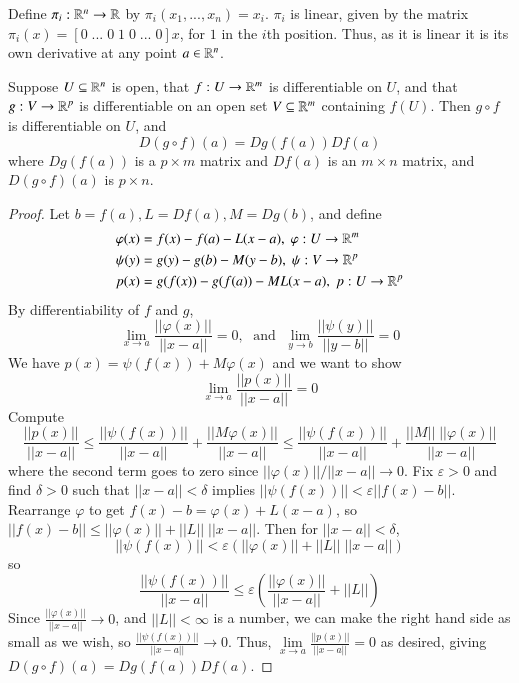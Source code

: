 \begin{example}
    Define $\pi_i :\mathbb R^n\rightarrow \mathbb R$ by $\pi_i(x_1,...,x_n) = x_i$. $\pi_i$ is linear, given by the matrix $\pi_i(x) = [0\;...\;0\;1\;0\;...\;0]x$, for $1$ in the $i$th position. Thus, as it is linear it is its own derivative at any point $a \in \mathbb R^n$.
\end{example}

\begin{proposition}
    Suppose $U \subseteq \mathbb R^n$ is open, that $f:U\rightarrow \mathbb R^m$ is differentiable on $U$, and that $g:V\rightarrow \mathbb R^p$ is differentiable on an open set $V \subseteq \mathbb R^m$ containing $f(U)$. Then $g\circ f$ is differentiable on $U$, and $$D(g\circ f)(a) = Dg(f(a))Df(a)$$ where $Dg(f(a))$ is a $p\times m$ matrix and $Df(a)$ is an $m\times n$ matrix, and $D(g\circ f)(a)$ is $p\times n$.
\end{proposition}
\begin{proof}
    Let $b = f(a), L = Df(a), M = Dg(b)$, and define \begin{align*}
        \varphi(x) &= f(x) - f(a) - L(x-a),\;\varphi:U\rightarrow \mathbb R^m \\
        \psi(y) &= g(y) - g(b) - M(y-b),\;\psi:V\rightarrow \mathbb R^p \\
        p(x) &= g(f(x)) - g(f(a)) - ML(x-a),\;p:U\rightarrow \mathbb R^p
    \end{align*}
    By differentiability of $f$ and $g$, $$\lim\limits_{x\rightarrow a}\frac{||\varphi(x)||}{||x-a||} = 0,\;\text{ and }\;\lim\limits_{y\rightarrow b}\frac{||\psi(y)||}{||y-b||} = 0$$ We have $p(x) = \psi(f(x)) + M\varphi(x)$ and we want to show $$\lim\limits_{x\rightarrow a}\frac{||p(x)||}{||x-a||} = 0$$ Compute $$\frac{||p(x)||}{||x-a||} \leq \frac{||\psi(f(x))||}{||x-a||} + \frac{||M\varphi(x)||}{||x-a||} \leq \frac{||\psi(f(x))||}{||x-a||} + \frac{||M||\;||\varphi(x)||}{||x-a||}$$ where the second term goes to zero since $||\varphi(x)||/||x-a||\rightarrow 0$. Fix $\varepsilon > 0$ and find $\delta > 0$ such that $||x-a|| < \delta$ implies $||\psi(f(x))|| < \varepsilon||f(x)-b||$. Rearrange $\varphi$ to get $f(x) - b = \varphi(x) + L(x-a)$, so $||f(x)-b|| \leq ||\varphi(x)|| + ||L||\;||x-a||$. Then for $||x-a|| < \delta$, $$||\psi(f(x))|| < \varepsilon(||\varphi(x)|| + ||L||\;||x-a||)$$ so $$\frac{||\psi(f(x))||}{||x-a||} \leq \varepsilon\left(\frac{||\varphi(x)||}{||x-a||} + ||L||\right)$$ Since $\frac{||\varphi(x)||}{||x-a||}\rightarrow 0$, and $||L|| < \infty$ is a number, we can make the right hand side as small as we wish, so $\frac{||\psi(f(x))||}{||x-a||}\rightarrow 0$. Thus, $\lim\limits_{x\rightarrow a}\frac{||p(x)||}{||x-a||} = 0$ as desired, giving $D(g\circ f)(a) = Dg(f(a))Df(a)$.
\end{proof}


